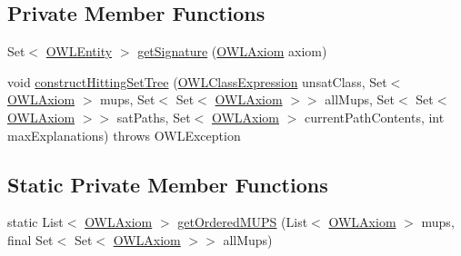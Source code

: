 \subsection*{Private Member Functions}
\begin{DoxyCompactItemize}
\item 
Set$<$ \hyperlink{interfaceorg_1_1semanticweb_1_1owlapi_1_1model_1_1_o_w_l_entity}{O\-W\-L\-Entity} $>$ \hyperlink{classcom_1_1clarkparsia_1_1owlapi_1_1explanation_1_1_h_s_t_explanation_generator_a7d2185ab191bfe96f84d3c1647417dce}{get\-Signature} (\hyperlink{interfaceorg_1_1semanticweb_1_1owlapi_1_1model_1_1_o_w_l_axiom}{O\-W\-L\-Axiom} axiom)
\item 
void \hyperlink{classcom_1_1clarkparsia_1_1owlapi_1_1explanation_1_1_h_s_t_explanation_generator_a17dfd15384a8aa0b1124c718b058f219}{construct\-Hitting\-Set\-Tree} (\hyperlink{interfaceorg_1_1semanticweb_1_1owlapi_1_1model_1_1_o_w_l_class_expression}{O\-W\-L\-Class\-Expression} unsat\-Class, Set$<$ \hyperlink{interfaceorg_1_1semanticweb_1_1owlapi_1_1model_1_1_o_w_l_axiom}{O\-W\-L\-Axiom} $>$ mups, Set$<$ Set$<$ \hyperlink{interfaceorg_1_1semanticweb_1_1owlapi_1_1model_1_1_o_w_l_axiom}{O\-W\-L\-Axiom} $>$$>$ all\-Mups, Set$<$ Set$<$ \hyperlink{interfaceorg_1_1semanticweb_1_1owlapi_1_1model_1_1_o_w_l_axiom}{O\-W\-L\-Axiom} $>$$>$ sat\-Paths, Set$<$ \hyperlink{interfaceorg_1_1semanticweb_1_1owlapi_1_1model_1_1_o_w_l_axiom}{O\-W\-L\-Axiom} $>$ current\-Path\-Contents, int max\-Explanations)  throws O\-W\-L\-Exception 
\end{DoxyCompactItemize}
\subsection*{Static Private Member Functions}
\begin{DoxyCompactItemize}
\item 
static List$<$ \hyperlink{interfaceorg_1_1semanticweb_1_1owlapi_1_1model_1_1_o_w_l_axiom}{O\-W\-L\-Axiom} $>$ \hyperlink{classcom_1_1clarkparsia_1_1owlapi_1_1explanation_1_1_h_s_t_explanation_generator_a2032e6e85a987d4d1b5e6907b7130500}{get\-Ordered\-M\-U\-P\-S} (List$<$ \hyperlink{interfaceorg_1_1semanticweb_1_1owlapi_1_1model_1_1_o_w_l_axiom}{O\-W\-L\-Axiom} $>$ mups, final Set$<$ Set$<$ \hyperlink{interfaceorg_1_1semanticweb_1_1owlapi_1_1model_1_1_o_w_l_axiom}{O\-W\-L\-Axiom} $>$$>$ all\-Mups)
\end{DoxyCompactItemize}
